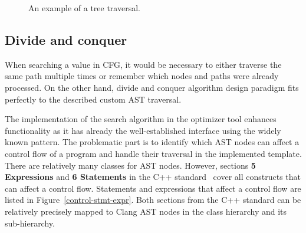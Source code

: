 \begin{figure}[h!]
\vspace{.5cm}
\centering
{}
\caption{An example of a tree traversal.}
\label{prefetch-example-ast}
\end{figure}

\subsection{Divide and conquer}
When searching a value in CFG, it would be necessary to either traverse the same path multiple times or remember which nodes and paths were already processed. On the other hand, divide and conquer algorithm design paradigm fits perfectly to the described custom AST traversal.

The implementation of the search algorithm in the optimizer tool enhances  functionality as it has already the well-established interface using the widely known pattern. The problematic part is to identify which AST nodes can affect a control flow of a program and handle their traversal in the implemented template. There are relatively many classes for AST nodes. However, sections \textbf{5 Expressions} and \textbf{6 Statements} in the C++ standard~\cite{standard} cover all constructs that can affect a control flow. Statements and expressions that affect a control flow are listed in Figure~\ref{control-stmt-expr}. Both sections from the C++ standard can be relatively precisely mapped to Clang AST nodes in the  class hierarchy and its  sub-hierarchy.

